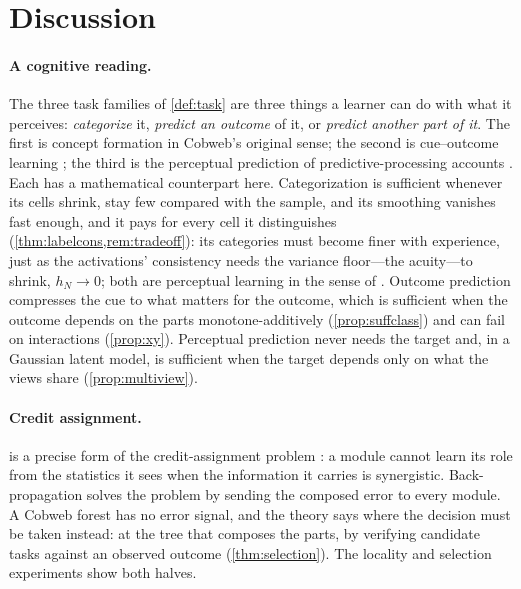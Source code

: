 \documentclass[11pt]{article}
\theoremstyle{definition}
\theoremstyle{remark}
\begin{document}
\section{Discussion}\label{sec:discussion}

\paragraph{A cognitive reading.}
The three task families of \cref{def:task} are three things a learner can do with what it
perceives: \emph{categorize} it, \emph{predict an outcome} of it, or \emph{predict
another part of it}.  The first is concept formation in Cobweb's original sense; the
second is cue--outcome learning \citep{rescorla1972}; the third is the perceptual
prediction of predictive-processing accounts \citep{clark2013}.  Each has a mathematical
counterpart here.  Categorization is sufficient whenever its cells shrink, stay few compared with the
sample, and its smoothing vanishes fast enough, and it pays for every cell it distinguishes (\cref{thm:labelcons,rem:tradeoff}):
its categories must become finer with experience, just as the activations' consistency
needs the variance floor---the acuity---to shrink, $h_N\to0$; both are perceptual learning
in the sense of \citet{goldstone1998}.  Outcome prediction
compresses the cue to what matters for the outcome, which is sufficient when the
outcome depends on the parts monotone-additively (\cref{prop:suffclass}) and can fail on
interactions (\cref{prop:xy}).  Perceptual prediction never needs the target and, in a
Gaussian latent model, is sufficient when the target depends only on what the views
share (\cref{prop:multiview}).

\paragraph{Credit assignment.}
 is a precise form of the credit-assignment problem
\citep{minsky1961}: a module cannot learn its role from the statistics it sees when the
information it carries is synergistic.  Back-propagation solves the problem by sending
the composed error to every module.  A Cobweb forest has no error signal, and the theory
says where the decision must be taken instead: at the tree that composes the parts, by
verifying candidate tasks against an observed outcome (\cref{thm:selection}).  The
locality and selection experiments show both halves.
\end{document}
